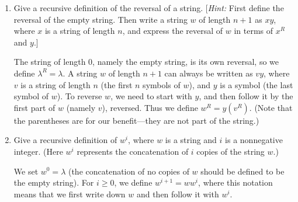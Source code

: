 \documentclass[11pt]{article}
\begin{document}
\begin{enumerate}[label=\textbf{\arabic*.}]
	\item Give a recursive definition of the reversal of a string. [\emph{Hint:} First define the reversal of the empty string. Then write a string $w$ of length $n + 1$ as $xy$, where $x$ is a string of length $n$, and express the reversal of $w$ in terms of $x^R$ and $y$.]
	
	The string of length 0, namely the empty string, is its own reversal, so we define $\lambda^R = \lambda$. A string $w$ of length $n + 1$ can always be written as $vy$, where $v$ is a string of length $n$ (the first $n$ symbols of $w$), and $y$ is a symbol (the last symbol of $w$). To reverse $w$, we need to start with $y$, and then follow it by the first part of $w$ (namely $v$), reversed. Thus we define $w^R = y(v^R)$. (Note that the parentheses are for our benefit---they are not part of the string.)
	
	\item Give a recursive definition of $w^i$, where $w$ is a string and $i$ is a nonnegative integer. (Here $w^i$ represents the concatenation of $i$ copies of the string $w$.)
	
	We set $w^0 = \lambda$ (the concatenation of no copies of $w$ should be defined to be the empty string). For $i \geq 0$, we define $w^{i + 1} = ww^i$, where this notation means that we first write down $w$ and then follow it with $w^i$.
\end{enumerate}
\end{document}
